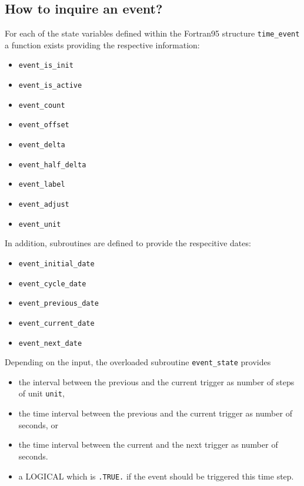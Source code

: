 \documentclass[twoside]{article}
\begin{document}
\subsection{How to inquire an event?}
For each of the state variables defined within the Fortran95 structure
\verb|time_event| a function exists providing the respective information:
%
\begin{itemize}
\item \verb|event_is_init|
\item \verb|event_is_active|
\item \verb|event_count|
\item \verb|event_offset|
\item \verb|event_delta|
\item \verb|event_half_delta|
\item \verb|event_label|
\item \verb|event_adjust|
\item \verb|event_unit|
\end{itemize}

In addition, subroutines are defined to provide the respecitive dates:
%
\begin{itemize}
\item \verb|event_initial_date|
\item \verb|event_cycle_date|
\item \verb|event_previous_date|
\item \verb|event_current_date|
\item \verb|event_next_date|
\end{itemize}

Depending on the input, the overloaded subroutine \verb|event_state| provides 
%
\begin{itemize}
\item the interval between the previous and the current trigger as number of 
      steps of unit \verb|unit|,
\item the time interval between the previous and the current trigger as 
      number of seconds, or
\item the time interval between the current and the next trigger as 
      number of seconds.
\item a {\footnotesize LOGICAL} which is \verb|.TRUE.| if the event should be triggered this
      time step.
\end{itemize}

\end{document}
